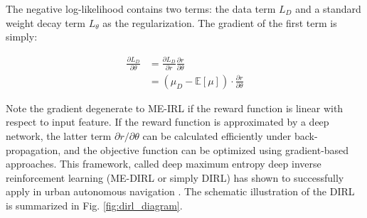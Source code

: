 \documentclass[../thesis.tex]{subfiles}
\begin{document}
The negative log-likelihood contains two terms: the data term $L_{D}$ and a standard weight decay term $L_{\theta}$ as the regularization.
The gradient of the first term is simply:
 
\begin{align}
\frac{\partial L_D}{\partial \theta} &= \frac{\partial L_D}{\partial r} \frac{\partial r}{\partial \theta} \\
&= (\mu_D - \mathbb{E}[\mu]) \cdot \frac{\partial r}{\partial \theta} \label{equ:dirl_grad}
\end{align}
 
Note the gradient degenerate to ME-IRL if the reward function is linear with respect to input feature.
If the reward function is approximated by a deep network, the latter term $\partial r / \partial \theta$ can be calculated efficiently under back-propagation, and the objective function can be optimized using gradient-based approaches.
This framework, called deep maximum entropy deep inverse reinforcement learning (ME-DIRL or simply DIRL) has shown to successfully apply in urban autonomous navigation \cite{wulfmeier2016watch}.
The schematic illustration of the DIRL is summarized in Fig. \ref{fig:dirl_diagram}.
 
 
 
 
\end{document}
